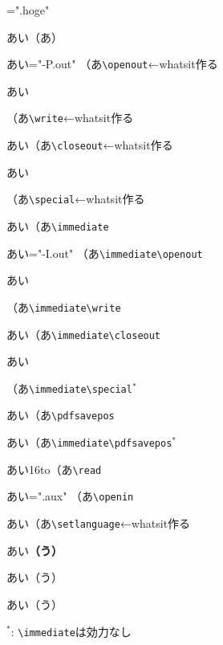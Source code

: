 \documentclass{jsarticle}
\begin{document}
\def\cs#1{\texttt{\textbackslash #1}}
\immediate{}="\jobname.hoge"\immediate{}

あい\inhibitglue（あ）

あい\inhibitglue{}="\jobname-P.out"
（あ\cs{openout}←whatsit作る

あい\inhibitglue{}（あ\cs{write}←whatsit作る

あい\inhibitglue{}（あ\cs{closeout}←whatsit作る

あい\inhibitglue{}（あ\cs{special}←whatsit作る

あい\inhibitglue\immediate（あ\cs{immediate}

あい\inhibitglue\immediate{}="\jobname-I.out"
（あ\cs{immediate}\cs{openout}

あい\inhibitglue\immediate{}（あ\cs{immediate}\cs{write}

あい\inhibitglue\immediate{}（あ\cs{immediate}\cs{closeout}

あい\inhibitglue\immediate{}（あ\cs{immediate}\cs{special}$^*$

あい\inhibitglue\pdfsavepos（あ\cs{pdfsavepos}

あい\inhibitglue\immediate\pdfsavepos（あ\cs{immediate}\cs{pdfsavepos}$^*$

あい\inhibitglue\read16to\CS （あ\cs{read}

あい\inhibitglue{}="\jobname.aux"
（あ\cs{openin}

あい\inhibitglue{}（あ\cs{setlanguage}←whatsit作る


あい\inhibitglue\textbf{（う）}

あい\inhibitglue\textsf{（う）}

あい\inhibitglue\textsf{（う）}

$^*$: \cs{immediate}は効力なし
\end{document}
